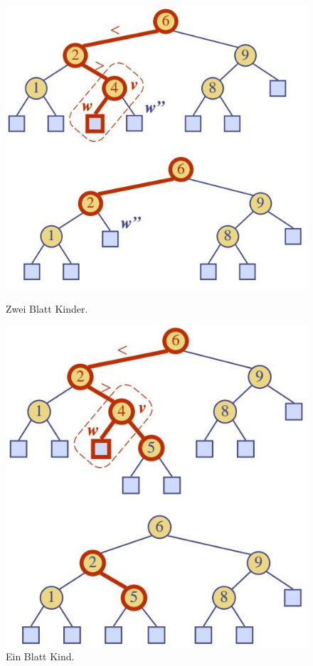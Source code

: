 \begin{description}
\begin{itemize}
\begin{figure}[ht!]
\begin{minipage}[t]{0.4\textwidth}
				\includegraphics[width=0.9\linewidth]{images/search_tree_delete_1}
				\caption{Zwei Blatt Kinder.}
				\label{fig:searchtreeinsert1}
			\end{minipage}
			\begin{minipage}[t]{0.4\textwidth}
				\centering
				\includegraphics[width=0.9\linewidth]{images/search_tree_delete_2}
				\caption{Ein Blatt Kind.}
				\label{fig:searchtreeinsert2}

\end{minipage}
\end{figure}
\end{itemize}
\end{description}
